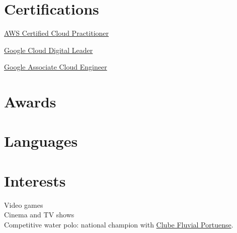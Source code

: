 \documentclass{seb-cv}
\begin{document}
\begin{minipage}[t]{0.31\textwidth}
\section{Certifications}
\begin{tightemize}
  \item \href{https://aws.amazon.com/certification/certified-cloud-practitioner/}{AWS Certified Cloud Practitioner}
  \item \href{https://cloud.google.com/learn/certification/cloud-digital-leader}{Google Cloud Digital Leader}
  \item \href{https://cloud.google.com/learn/certification/cloud-engineer}{Google Associate Cloud Engineer}
\end{tightemize}

\section{Awards}

\section{Languages}

\section{Interests}
\faGamepad \hspace{0.1cm} Video games \\
\faFilm \hspace{0.2cm} Cinema and TV shows \\
\faDumbbell \hspace{0.1cm} Competitive water polo: national champion with \href{https://fluvial.pt/}{Clube Fluvial Portuense}.

\end{minipage}
\end{document}
